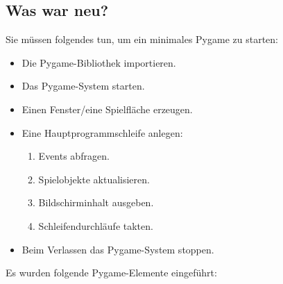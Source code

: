 
\newpage
\subsection*{Was war neu?}

Sie müssen folgendes tun, um ein minimales Pygame zu starten:
\begin{itemize}
    \item Die Pygame-Bibliothek importieren.
    \item Das Pygame-System starten.
    \item Einen Fenster/eine Spielfläche erzeugen.
    \item Eine Hauptprogrammschleife anlegen:
    \begin{enumerate}
        \item Events abfragen.
        \item Spielobjekte aktualisieren.
        \item Bildschirminhalt ausgeben.
        \item Schleifendurchläufe takten.
    \end{enumerate}
    \item Beim Verlassen das Pygame-System stoppen.
\end{itemize}

Es wurden folgende Pygame-Elemente eingeführt:

